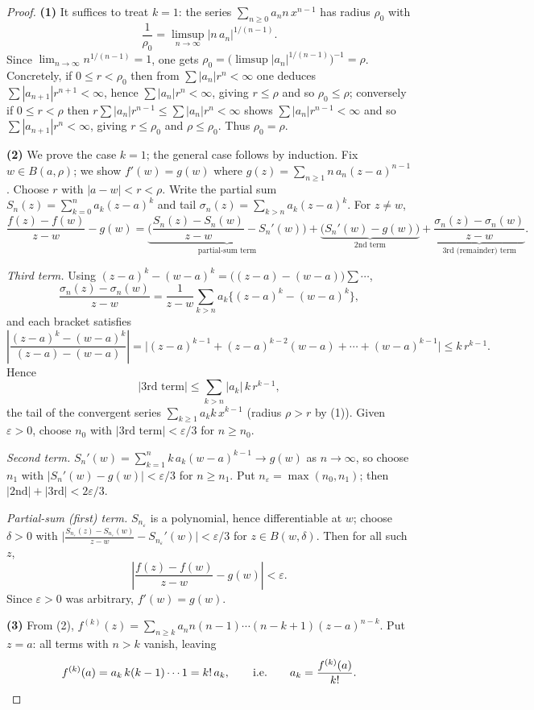 \documentclass[11pt,openany]{report}
\newcommand{\abs}[1]{\left\lvert #1 \right\rvert}
\newcommand{\eps}{\varepsilon}
\begin{document}
\begin{proof}
\textbf{(1)} It suffices to treat $k=1$: the series $\sum_{n\ge0} a_n n\,x^{n-1}$ has
radius $\rho_0$ with
\[
  \frac{1}{\rho_0} = \limsup_{n\to\infty}\abs{n\,a_n}^{1/(n-1)}.
\]
Since $\lim_{n\to\infty} n^{1/(n-1)} = 1$, one gets
$\rho_0 = \big(\limsup\abs{a_n}^{1/(n-1)}\big)^{-1} = \rho$. Concretely, if
$0\le r<\rho_0$ then from $\sum\abs{a_n}r^n<\infty$ one deduces
$\sum\abs{a_{n+1}}r^{n+1}<\infty$, hence $\sum\abs{a_n}r^n<\infty$, giving $r\le\rho$ and
so $\rho_0\le\rho$; conversely if $0\le r<\rho$ then
$r\sum\abs{a_n}r^{n-1}\le\sum\abs{a_n}r^n<\infty$ shows $\sum\abs{a_n}r^{n-1}<\infty$ and
so $\sum\abs{a_{n+1}}r^n<\infty$, giving $r\le\rho_0$ and $\rho\le\rho_0$. Thus
$\rho_0=\rho$.

\textbf{(2)} We prove the case $k=1$; the general case follows by induction. Fix
$w\in B(a,\rho)$; we show $f'(w)=g(w)$ where
$g(z)=\sum_{n\ge1}n\,a_n(z-a)^{n-1}$. Choose $r$ with $\abs{a-w}<r<\rho$. Write the
partial sum $S_n(z)=\sum_{k=0}^{n} a_k(z-a)^k$ and tail
$\sigma_n(z)=\sum_{k>n} a_k(z-a)^k$. For $z\ne w$,
\[
  \frac{f(z)-f(w)}{z-w} - g(w)
  = \underbrace{\Big(\frac{S_n(z)-S_n(w)}{z-w} - S_n'(w)\Big)}_{\text{partial-sum term}}
  + \underbrace{\bigl(S_n'(w)-g(w)\bigr)}_{\text{2nd term}}
  + \underbrace{\frac{\sigma_n(z)-\sigma_n(w)}{z-w}}_{\text{3rd (remainder) term}} .
\]

\emph{Third term.} Using $(z-a)^k-(w-a)^k=\bigl((z-a)-(w-a)\bigr)\sum \cdots$,
\[
  \frac{\sigma_n(z)-\sigma_n(w)}{z-w}
  = \frac{1}{z-w}\sum_{k>n} a_k\bigl\{(z-a)^k-(w-a)^k\bigr\},
\]
and each bracket satisfies
\[
  \left\lvert\frac{(z-a)^k-(w-a)^k}{(z-a)-(w-a)}\right\rvert
  = \bigl\lvert (z-a)^{k-1}+(z-a)^{k-2}(w-a)+\cdots+(w-a)^{k-1}\bigr\rvert
  \le k\,r^{k-1}.
\]
Hence
\[
  \bigl\lvert\text{3rd term}\bigr\rvert \le \sum_{k>n}\abs{a_k}\,k\,r^{k-1},
\]
the tail of the convergent series $\sum_{k\ge1}a_k k\,x^{k-1}$ (radius $\rho>r$ by (1)).
Given $\eps>0$, choose $n_0$ with $\bigl\lvert\text{3rd term}\bigr\rvert<\eps/3$ for
$n\ge n_0$.

\emph{Second term.} $S_n'(w)=\sum_{k=1}^{n}k\,a_k(w-a)^{k-1}\to g(w)$ as $n\to\infty$, so
choose $n_1$ with $\abs{S_n'(w)-g(w)}<\eps/3$ for $n\ge n_1$. Put $n_\eps=\max(n_0,n_1)$;
then $\bigl\lvert\text{2nd}\bigr\rvert+\bigl\lvert\text{3rd}\bigr\rvert<2\eps/3$.

\emph{Partial-sum (first) term.} $S_{n_\eps}$ is a polynomial, hence differentiable at
$w$; choose $\delta>0$ with
$\bigl\lvert\frac{S_{n_\eps}(z)-S_{n_\eps}(w)}{z-w}-S_{n_\eps}'(w)\bigr\rvert<\eps/3$ for
$z\in B(w,\delta)$. Then for all such $z$,
\[
  \left\lvert \frac{f(z)-f(w)}{z-w} - g(w) \right\rvert < \eps.
\]
Since $\eps>0$ was arbitrary, $f'(w)=g(w)$.

\textbf{(3)} From (2), $f^{(k)}(z)=\sum_{n\ge k}a_n n(n-1)\cdots(n-k+1)(z-a)^{n-k}$. Put
$z=a$: all terms with $n>k$ vanish, leaving
\[
  f^{(k)}(a) = a_k\, k(k-1)\cdots 1 = k!\,a_k,
  \qquad\text{i.e.}\qquad a_k = \frac{f^{(k)}(a)}{k!}. \qedhere
\]
\end{proof}
\end{document}
